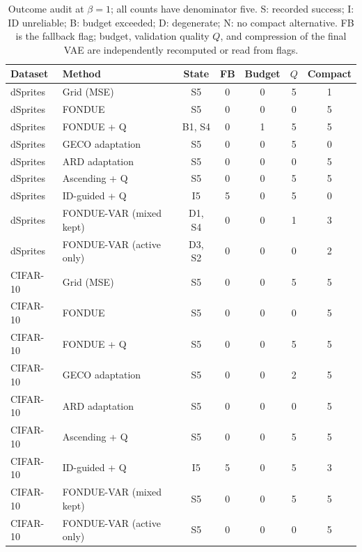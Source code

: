 \documentclass[make,article,submit,pdftex,moreauthors]{Definitions/mdpi}
\begin{document}
\begin{table}[H]
\caption{Outcome audit at $\beta=1$; all counts have denominator five. S: recorded success; I: ID unreliable; B: budget exceeded; D: degenerate; N: no compact alternative. FB is the fallback flag; budget, validation quality $Q$, and compression of the final VAE are independently recomputed or read from flags.}\label{tab:outcomes1}
\footnotesize
\setlength{\tabcolsep}{3.5pt}
\begin{tabular*}{\textwidth}{@{\extracolsep{\fill}}llccccc@{}}
\toprule
Dataset & Method & State & FB & Budget & $Q$ & Compact \\
\midrule
dSprites & Grid (MSE) & S5 & 0 & 0 & 5 & 1 \\
dSprites & FONDUE & S5 & 0 & 0 & 0 & 5 \\
dSprites & FONDUE + Q & B1, S4 & 0 & 1 & 5 & 5 \\
dSprites & GECO adaptation & S5 & 0 & 0 & 5 & 0 \\
dSprites & ARD adaptation & S5 & 0 & 0 & 0 & 5 \\
dSprites & Ascending + Q & S5 & 0 & 0 & 5 & 5 \\
dSprites & ID-guided + Q & I5 & 5 & 0 & 5 & 0 \\
dSprites & FONDUE-VAR (mixed kept) & D1, S4 & 0 & 0 & 1 & 3 \\
dSprites & FONDUE-VAR (active only) & D3, S2 & 0 & 0 & 0 & 2 \\
CIFAR-10 & Grid (MSE) & S5 & 0 & 0 & 5 & 5 \\
CIFAR-10 & FONDUE & S5 & 0 & 0 & 0 & 5 \\
CIFAR-10 & FONDUE + Q & S5 & 0 & 0 & 5 & 5 \\
CIFAR-10 & GECO adaptation & S5 & 0 & 0 & 2 & 5 \\
CIFAR-10 & ARD adaptation & S5 & 0 & 0 & 0 & 5 \\
CIFAR-10 & Ascending + Q & S5 & 0 & 0 & 5 & 5 \\
CIFAR-10 & ID-guided + Q & I5 & 5 & 0 & 5 & 3 \\
CIFAR-10 & FONDUE-VAR (mixed kept) & S5 & 0 & 0 & 5 & 5 \\
CIFAR-10 & FONDUE-VAR (active only) & S5 & 0 & 0 & 0 & 5 \\
\bottomrule
\end{tabular*}
\end{table}
\end{document}
